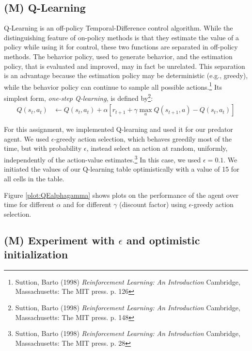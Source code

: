 \documentclass{article}
\begin{document}
\subsection{(M) Q-Learning}\label{sec:exercise1}
Q-Learning is an off-policy Temporal-Difference control algorithm.
While the distinguishing feature of on-policy methods is that they estimate the value of a policy while using it for control, these two functions are separated in off-policy methods. The behavior policy, used to generate behavior, and the estimation policy, that is evaluated and improved, may in fact be unrelated. This separation is an advantage because the estimation policy may be deterministic (e.g., greedy), while the behavior policy can continue to sample all possible actions.\footnote{Suttion, Barto (1998) \textit{Reinforcement Learning: An Introduction} Cambridge, Massachusetts: The MIT press. p. 126} Its simplest form, \textit{one-step Q-learning}, is defined by\footnote{Suttion, Barto (1998) \textit{Reinforcement Learning: An Introduction} Cambridge, Massachusetts: The MIT press. p. 148}:
\begin{align*}
Q(s_t,a_t) & \leftarrow Q(s_t,a_t) + \alpha \left[ r_{t+1} + \gamma \displaystyle\max_a Q(s_{t+1},a) - Q(s_t,a_t) \right]
\end{align*}

For this assignment, we implemented Q-learning and used it for our predator agent. We used $\epsilon$-greedy action selection, which behaves greedily most of the time, but with probability $\epsilon$, instead select an action at random, uniformly, independently of the action-value estimates.\footnote{Suttion, Barto (1998) \textit{Reinforcement Learning: An Introduction} Cambridge, Massachusetts: The MIT press. p. 28} In this case, we used $\epsilon = 0.1$. We initiated the values of our Q-learning table optimistically with a value of 15 for all cells in the table.

Figure \ref{plot:QEalphagamma} shows plots on the performance of the agent over time for different $\alpha$ and for different $\gamma$ (discount factor) using $\epsilon$-greedy action selection.

 \label{plot:QEalphagamma}

\subsection{(M) Experiment with $\epsilon$ and optimistic initialization}\label{sec:exercise2}
\end{document}
